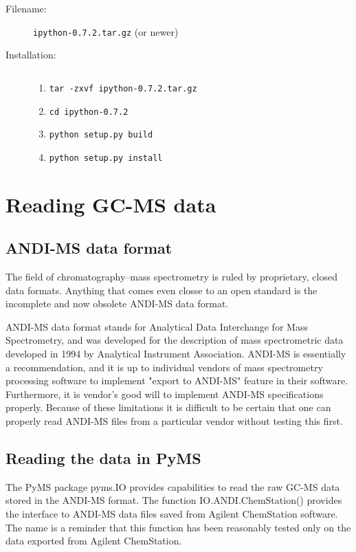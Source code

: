 \begin{description}
\item [Filename:] {\tt ipython-0.7.2.tar.gz} (or newer)
\item [Installation:] $ $
  \begin{enumerate}
  \item {\tt tar -zxvf ipython-0.7.2.tar.gz}
  \item {\tt cd ipython-0.7.2}
  \item {\tt python setup.py build}
  \item {\tt python setup.py install}
  \end{enumerate}
\end{description}


\section{Reading GC-MS data}

\subsection{ANDI-MS data format}

The field of chromatography--mass spectrometry is ruled by proprietary, closed
data formats.  Anything that comes even closse to an open standard is the
incomplete and now obsolete ANDI-MS data format.

ANDI-MS data format stands for Analytical Data Interchange for Mass
Spectrometry, and was developed for the description of mass spectrometric
data developed in 1994 by Analytical Instrument Association. ANDI-MS 
is essentially a recommendation, and it is up to individual vendors of
mass spectrometry processing software to implement "export to ANDI-MS"
feature in their software. Furthermore, it is vendor's good will to
implement ANDI-MS specifications properly. Because of these limitations
it is difficult to be certain that one can properly read ANDI-MS files
from a particular vendor without testing this first.

\subsection{Reading the data in PyMS}

The PyMS package pyms.IO provides capabilities to read the raw GC-MS
data stored in the ANDI-MS format. The function IO.ANDI.ChemStation()
provides the interface to ANDI-MS data files saved from Agilent
ChemStation software. The name is a reminder that this function has
been reasonably tested only on the data exported from Agilent ChemStation.


